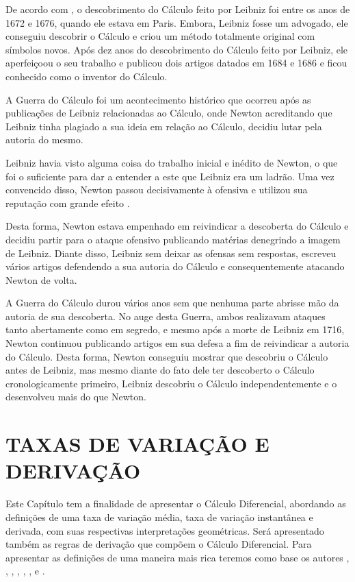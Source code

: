 \documentclass[
	12pt,				%
	openright,			%
    twoside,			%
	a4paper,			%
	chapter=TITLE,		%
	english,			%
	french,				%
	spanish,			%
	brazil				%
	]{abntex2}
\numberwithin{lema}{chapter}
\numberwithin{teorema}{chapter}
\numberwithin{definicao}{chapter}
\numberwithin{exemplo}{chapter}
\numberwithin{figure}{chapter}
\begin{document}
De acordo com , o descobrimento do Cálculo feito por Leibniz foi entre os anos de 1672 e 1676, quando ele estava em Paris. Embora, Leibniz fosse um advogado, ele conseguiu descobrir o Cálculo e criou um método totalmente original com símbolos novos. Após dez anos do descobrimento do Cálculo feito por Leibniz, ele aperfeiçoou o seu trabalho e publicou dois artigos datados em 1684 e 1686 e ficou conhecido como o inventor do Cálculo.

A Guerra do Cálculo foi um acontecimento histórico que ocorreu após as publicações de Leibniz relacionadas ao Cálculo, onde Newton acreditando que Leibniz tinha plagiado a sua ideia em relação ao Cálculo, decidiu lutar pela autoria do mesmo.

\begin{citacao}
Leibniz havia visto alguma coisa do trabalho inicial e inédito de Newton, o que foi o suficiente para dar a entender a este que Leibniz era um ladrão. Uma vez convencido disso, Newton passou decisivamente à ofensiva e utilizou sua reputação com grande efeito \cite[p. 12]{bardi}.
\end{citacao}

Desta forma, Newton estava empenhado em reivindicar a descoberta do Cálculo e decidiu partir para o ataque ofensivo publicando matérias denegrindo a imagem de Leibniz. Diante disso, Leibniz sem deixar as ofensas sem respostas, escreveu vários artigos defendendo a sua autoria do Cálculo  e consequentemente atacando Newton de volta. 

A Guerra do Cálculo durou vários anos sem que nenhuma parte abrisse mão da autoria de sua descoberta. No auge desta Guerra, ambos realizavam ataques tanto abertamente como em segredo, e mesmo após a morte de Leibniz em 1716, Newton continuou publicando artigos em sua defesa a fim de reivindicar a autoria do Cálculo. Desta forma, Newton conseguiu mostrar que descobriu o Cálculo antes de Leibniz, mas mesmo diante do fato dele ter descoberto o Cálculo cronologicamente primeiro, Leibniz descobriu o Cálculo independentemente e o desenvolveu mais do que Newton.
  
\chapter{TAXAS DE VARIAÇÃO E DERIVAÇÃO}
\label{capitulo_2}
\thispagestyle{empty}

Este Capítulo tem a finalidade de apresentar o Cálculo Diferencial, abordando as definições de uma taxa de variação média, taxa de variação instantânea e derivada, com suas respectivas interpretações geométricas. Será apresentado também as regras de derivação que compõem o Cálculo Diferencial. Para apresentar as definições de uma maneira mais rica teremos como base os autores , , , , , ,  e .
\end{document}
